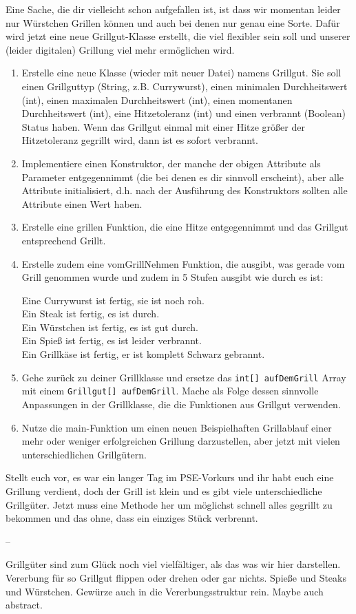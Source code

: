 \documentclass{../../sheet}
\begin{document}
\newpage
{}
Eine Sache, die dir vielleicht schon aufgefallen ist, ist dass wir momentan leider nur Würstchen Grillen können und auch bei denen nur genau eine Sorte. Dafür wird jetzt eine neue Grillgut-Klasse erstellt, die viel flexibler sein soll und unserer (leider digitalen) Grillung viel mehr ermöglichen wird.
\begin{enumerate}
    \item Erstelle eine neue Klasse (wieder mit neuer Datei) namens Grillgut. Sie soll einen Grillguttyp (String, z.B. Currywurst), einen minimalen Durchheitswert (int), einen maximalen Durchheitswert (int), einen momentanen Durchheitswert (int), eine Hitzetoleranz (int) und einen verbrannt (Boolean) Status haben. Wenn das Grillgut einmal mit einer Hitze größer der Hitzetoleranz gegrillt wird, dann ist es sofort verbrannt.
    \item Implementiere einen Konstruktor, der manche der obigen Attribute als Parameter entgegennimmt (die bei denen es dir sinnvoll erscheint), aber alle Attribute initialisiert, d.h. nach der Ausführung des Konstruktors sollten alle Attribute einen Wert haben.
    \item Erstelle eine grillen Funktion, die eine Hitze entgegennimmt und das Grillgut entsprechend Grillt. 
    \item Erstelle zudem eine vomGrillNehmen Funktion, die ausgibt, was gerade vom Grill genommen wurde und zudem in 5 Stufen ausgibt wie durch es ist:
    \begin{ausgabe}
Eine Currywurst ist fertig, sie ist noch roh.\\
Ein Steak ist fertig, es ist durch.\\
Ein Würstchen ist fertig, es ist gut durch.\\
Ein Spieß ist fertig, es ist leider verbrannt.\\
Ein Grillkäse ist fertig, er ist komplett Schwarz gebrannt.
    \end{ausgabe}
    \item Gehe zurück zu deiner Grillklasse und ersetze das \texttt{int[] aufDemGrill} Array mit einem \texttt{Grillgut[] aufDemGrill}. Mache als Folge dessen sinnvolle Anpassungen in der Grillklasse, die die Funktionen aus Grillgut verwenden.
    \item Nutze die main-Funktion um einen neuen Beispielhaften Grillablauf einer mehr oder weniger erfolgreichen
    Grillung darzustellen, aber jetzt mit vielen unterschiedlichen Grillgütern.
\end{enumerate}

\newpage
{}
Stellt euch vor, es war ein langer Tag im PSE-Vorkurs und ihr habt euch eine Grillung verdient, doch der Grill ist klein und es gibt viele unterschiedliche Grillgüter. Jetzt muss eine Methode her um möglichst schnell alles gegrillt zu bekommen und das ohne, dass ein einziges Stück verbrennt.


--


Grillgüter sind zum Glück noch viel vielfältiger, als das was wir hier darstellen. Vererbung für so Grillgut flippen oder drehen oder gar nichts. Spieße und Steaks und Würstchen. Gewürze auch in die Vererbungsstruktur rein. Maybe auch abstract.
\end{document}
